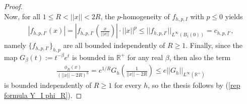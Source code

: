 \documentclass{article}
\numberwithin{equation}{section}
\begin{document}
\begin{proof}
\\
Now, for all $1\leq R<||x||<2R$, the $p$-homogeneity of $f_{h,p,I}$ with $p \leq 0$ yields
\begin{align*}
    |f_{h,p,I'}(x)| = \left|f_{h,p,I'}\left( \frac{x}{||x||} \right)\right| \cdot ||x||^p \leq ||f_{h,p,I'}||_{L^{\infty}(B_1(0))}=c_{h,p,I'},
\end{align*}
namely $\{f_{h,p,I'}\}_{h,p}$ are all bounded independently of $R \geq 1$.
Finally, since the map $G_{\beta}(t):=t^{-\beta} e^{t}$ is bounded in $\mathbb{R}^+$ for any real $\beta$, then also the term
\begin{align*}
    \frac{\phi_R(x)}{(||x||-2R)^h}=e^{1/R} G_{h} \left( \frac{1}{||x||-2R} \right) \leq e ||G_h||_{L^{\infty}(\mathbb{R}^+)}
\end{align*}
is bounded independently of $R \geq 1$ for every $h$, so the thesis follows by (\ref{rep formula Y_I phi_R}).
\end{proof}

\vspace{2mm}
\end{document}
